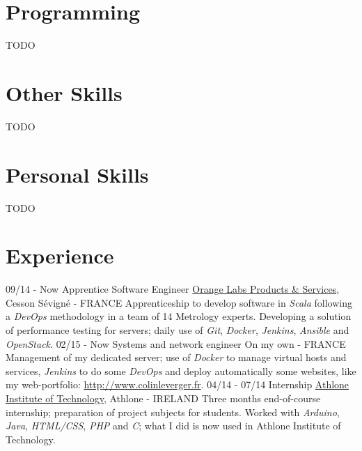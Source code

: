\documentclass[]{friggeri-cv}
\begin{document}
\begin{aside}
  \section{Programming}
  TODO
    ~
  \section{Other Skills}
  TODO
    ~
  \section{Personal Skills}
  TODO
    ~
\end{aside}

\section{Experience}
\begin{entrylist}
  \entry
    {09/14 - Now}
    {Apprentice Software Engineer}
    {\href{http://www.orange.com/en/home}{Orange Labs Products \& Services}, Cesson S\'evign\'e - FRANCE}
    {Apprenticeship to develop software in \emph{Scala} following a \emph{DevOps} methodology in a team of 14 Metrology experts. Developing a solution of performance testing for servers; daily use of \emph{Git}, \emph{Docker}, \emph{Jenkins}, \emph{Ansible} and \emph{OpenStack}.}
  \entry
    {02/15 - Now}
    {Systems and network engineer}
    {On my own - FRANCE}
    {Management of my dedicated server; use of \emph{Docker} to manage virtual hosts and services, \emph{Jenkins} to do some \emph{DevOps} and deploy automatically some websites, like my web-portfolio: \href{http://www.colinleverger.fr}{http://www.colinleverger.fr}.}
  \entry
    {04/14 - 07/14}
    {Internship}
    {\href{http://www.ait.ie/}{Athlone Institute of Technology}, Athlone - IRELAND}
    {Three months end-of-course internship; preparation of project subjects for students. Worked with \emph{Arduino}, \emph{Java}, \emph{HTML/CSS}, \emph{PHP} and \emph{C}; what I did is now used in Athlone Institute of Technology.}
\end{entrylist}
\end{document}
